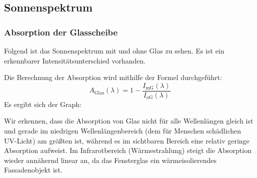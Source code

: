 \clearpage
\subsection{Sonnenspektrum}
\subsubsection{Absorption der Glasscheibe}
Folgend ist das Sonnenspektrum mit und ohne Glas zu sehen. Es ist ein erkennbarer Intensitätsunterschied vorhanden.\par
{}
Die Berechnung der Absorption wird mithilfe der Formel durchgeführt: 
\begin{equation}
  A_\text{Glas}(\lambda)=1-\frac{I_\text{mG}(\lambda)}{I_\text{oG}(\lambda)}
  \label{eq:Absorption}
\end{equation}
Es ergibt sich der Graph:\par
{}
Wir erkennen, dass die Absorption von Glas nicht für alle Wellenlängen gleich ist und gerade im
niedrigen Wellenlängenbereich (dem für Menschen schädlichen UV-Licht) am größten ist, während es im sichtbaren Bereich eine relativ geringe Absorption aufweist. Im Infrarotbereich (Wärmestrahlung) steigt die Absorption wieder annähernd linear an, da das Fensterglas ein wärmeisolierendes Fassadenobjekt ist. 

